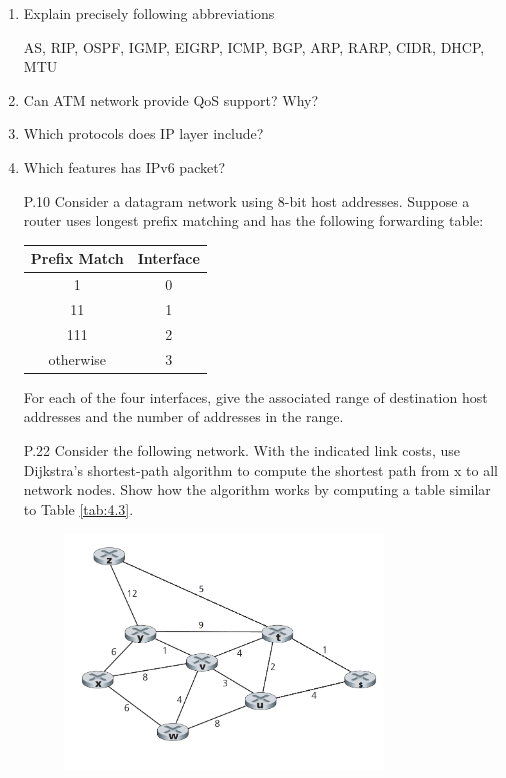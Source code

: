 \begin{enumerate}
    \item Explain precisely following abbreviations

	AS, RIP, OSPF, IGMP, EIGRP, ICMP, BGP, ARP, RARP, CIDR, DHCP, MTU

	\item Can ATM network provide QoS support? Why?
	\item Which protocols does IP layer include?
	\item Which features has IPv6 packet?
	\item[P.10] Consider a datagram network using 8-bit host addresses. Suppose a router uses longest prefix matching and has the following forwarding table:
	
	\begin{tabular}{cc}
	    \hline
	    Prefix Match & Interface \\
	    \hline
	    1 & 0 \\
	    11 & 1 \\
	    111 & 2 \\
	    otherwise & 3 \\
	    \hline
	\end{tabular}
	
	For each of the four interfaces, give the associated range of destination host addresses and the number of addresses in the range.
	
	\item[P.22] Consider the following network. With the indicated link costs, use Dijkstra's shortest-path algorithm to compute the shortest path from x to all network nodes. Show how the algorithm works by computing a table similar to Table \ref{tab:4.3}.
    
    \begin{figure}[H]
        \centering
        \includegraphics[width=0.8\textwidth]{4/P22.png}
    \end{figure}
	

\end{enumerate}

